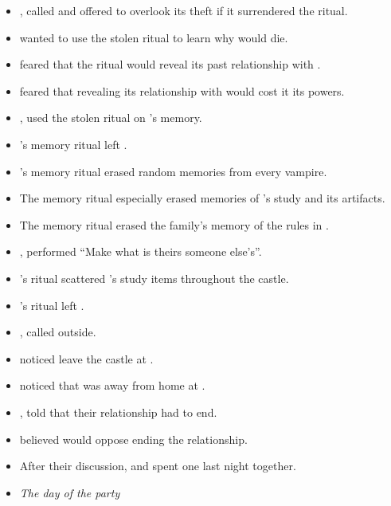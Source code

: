 \begin{itemize}
  \item {},  called  and offered to overlook its theft if it surrendered the ritual.
  \item {} wanted to use the stolen ritual to learn why  would die.
  \item {} feared that the ritual would reveal its past relationship with .
  \item {} feared that revealing its relationship with  would cost it its powers.
  \item {},  used the stolen ritual on 's memory.
  \item {}'s memory ritual left .
  \item {}'s memory ritual erased random memories from every vampire.
  \item The memory ritual especially erased memories of 's study and its artifacts.
  \item The memory ritual erased the family's memory of the rules in .
  \item {},  performed ``Make what is theirs someone else's''.
  \item {}'s ritual scattered 's study items throughout the castle.
  \item {}'s ritual left .
  \item {},  called  outside.
  \item {} noticed  leave the castle at .
  \item {} noticed that  was away from home at .
  \item {},  told  that their relationship had to end.
  \item {} believed  would oppose ending the relationship.
  \item After their discussion,  and  spent one last night together.

  \item[] \textit{The day of the party}


\end{itemize}
